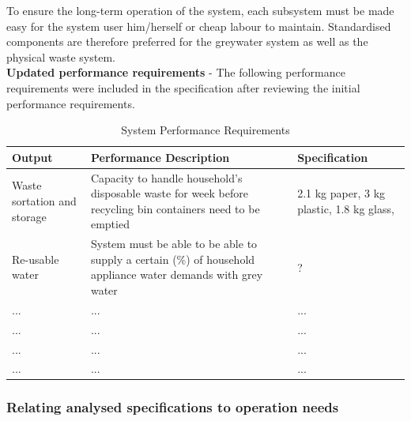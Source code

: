 \documentclass[a4paper,11pt,fleqn]{report}
\begin{document}
To ensure the long-term operation of the system, each subsystem must be made easy for the system user him/herself or cheap labour to maintain. Standardised components are therefore preferred for the greywater system as well as the physical waste system. \\

\noindent\textbf{Updated performance requirements} -
The following performance requirements were included in the specification after reviewing the initial performance requirements.
%
\begin{table}[h!]
\caption {System Performance Requirements} \label{tb: Functional_SS_elements} 
\begin{center}
\begin{tabular}{p{3cm}|p{6cm}|p{5.5cm}}\toprule
	{\textbf{Output}} & {\textbf{Performance Description}} & {\textbf{Specification}}\\ \midrule
    \hline
   Waste sortation and storage & Capacity to handle household's disposable waste for week before recycling bin containers need to be emptied  & 2.1 kg paper, 3 kg plastic, 1.8 kg glass, \citep{Sithole2014}\\
        \hline
    Re-usable water & System must be able to be able to supply a certain (\%) of household appliance water demands with grey water & ?\\
        \hline
    ... & ... & ...\\
        \hline
    ... & ... & ...\\
        \hline
    ... & ... & ...\\
        \hline
    ... & ... & ...\\

    \bottomrule
\end{tabular}
\end{center}
\end{table}
%
\subsubsection{Relating analysed specifications to operation needs}
\end{document}
